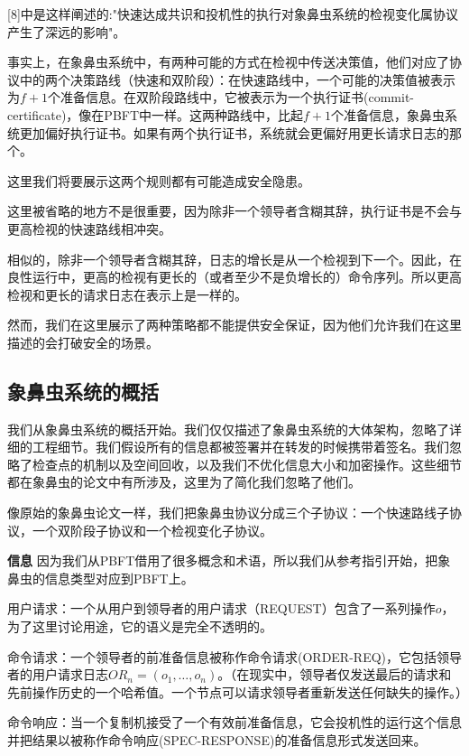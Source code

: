 \documentclass[UTF8]{ctexart}
\begin{document}
[8]中是这样阐述的:"快速达成共识和投机性的执行对象鼻虫系统的检视变化属协议产生了深远的影响"。

事实上，在象鼻虫系统中，有两种可能的方式在检视中传送决策值，他们对应了协议中的两个决策路线（快速和双阶段）：在快速路线中，一个可能的决策值被表示为$f + 1$个准备信息。在双阶段路线中，它被表示为一个执行证书(commit-certificate)，像在PBFT中一样。这两种路线中，比起$f + 1$个准备信息，象鼻虫系统更加偏好执行证书。如果有两个执行证书，系统就会更偏好用更长请求日志的那个。

这里我们将要展示这两个规则都有可能造成安全隐患。

这里被省略的地方不是很重要，因为除非一个领导者含糊其辞，执行证书是不会与更高检视的快速路线相冲突。

相似的，除非一个领导者含糊其辞，日志的增长是从一个检视到下一个。因此，在良性运行中，更高的检视有更长的（或者至少不是负增长的）命令序列。所以更高检视和更长的请求日志在表示上是一样的。

然而，我们在这里展示了两种策略都不能提供安全保证，因为他们允许我们在这里描述的会打破安全的场景。

\subsection{象鼻虫系统的概括}
我们从象鼻虫系统的概括开始。我们仅仅描述了象鼻虫系统的大体架构，忽略了详细的工程细节。我们假设所有的信息都被签署并在转发的时候携带着签名。我们忽略了检查点的机制以及空间回收，以及我们不优化信息大小和加密操作。这些细节都在象鼻虫的论文中有所涉及，这里为了简化我们忽略了他们。

像原始的象鼻虫论文一样，我们把象鼻虫协议分成三个子协议：一个快速路线子协议，一个双阶段子协议和一个检视变化子协议。

\vspace{3mm}

\textbf{信息} \hspace{3mm} 因为我们从PBFT借用了很多概念和术语，所以我们从参考指引开始，把象鼻虫的信息类型对应到PBFT上。

用户请求：一个从用户到领导者的用户请求（REQUEST）包含了一系列操作$o$，为了这里讨论用途，它的语义是完全不透明的。

命令请求：一个领导者的前准备信息被称作命令请求(ORDER-REQ)，它包括领导者的用户请求日志$OR_n = (o_1, \ldots, o_n)$。（在现实中，领导者仅发送最后的请求和先前操作历史的一个哈希值。一个节点可以请求领导者重新发送任何缺失的操作。）

命令响应：当一个复制机接受了一个有效前准备信息，它会投机性的运行这个信息并把结果以被称作命令响应(SPEC-RESPONSE)的准备信息形式发送回来。
\end{document}
